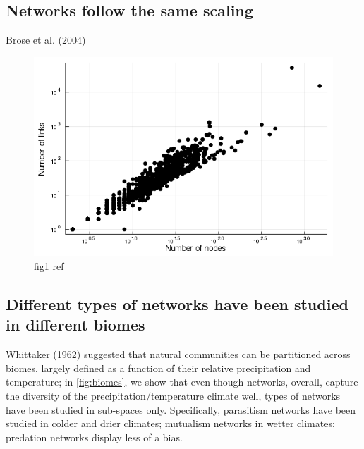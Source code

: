 \hypertarget{networks-follow-the-same-scaling}{%
\subsection{Networks follow the same
scaling}\label{networks-follow-the-same-scaling}}

Brose et al. (2004)

\begin{figure}
\centering
\includegraphics{figures/figure_01_b.png}
\caption{fig1 ref\label{fig:lssl}}
\end{figure}

\hypertarget{different-types-of-networks-have-been-studied-in-different-biomes}{%
\subsection{Different types of networks have been studied in different
biomes}\label{different-types-of-networks-have-been-studied-in-different-biomes}}

Whittaker (1962) suggested that natural communities can be partitioned
across biomes, largely defined as a function of their relative
precipitation and temperature; in \ref{fig:biomes}, we show that even
though networks, overall, capture the diversity of the
precipitation/temperature climate well, types of networks have been
studied in sub-spaces only. Specifically, parasitism networks have been
studied in colder and drier climates; mutualism networks in wetter
climates; predation networks display less of a bias.

